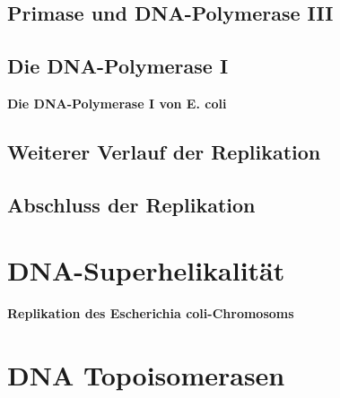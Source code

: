 \subsection{Primase und DNA-Polymerase III}\label{subsec:primase-und-dna-polymerase-iii}

\subsection{Die DNA-Polymerase I}\label{subsec:die-dna-polymerase-i}

\begin{bsp}
    \textbf{Die DNA-Polymerase I von E. coli}
\end{bsp}

\subsection{Weiterer Verlauf der Replikation}\label{subsec:weiterer-verlauf-der-replikation}


\subsection{Abschluss der Replikation}\label{subsec:abschluss-der-replikation}


\section{DNA-Superhelikalität}\label{sec:dna-superhelikalitat}


\begin{bsp}
    \textbf{Replikation des Escherichia coli-Chromosoms}
\end{bsp}

\section{DNA Topoisomerasen}\label{sec:dna-topoisomerasen}

